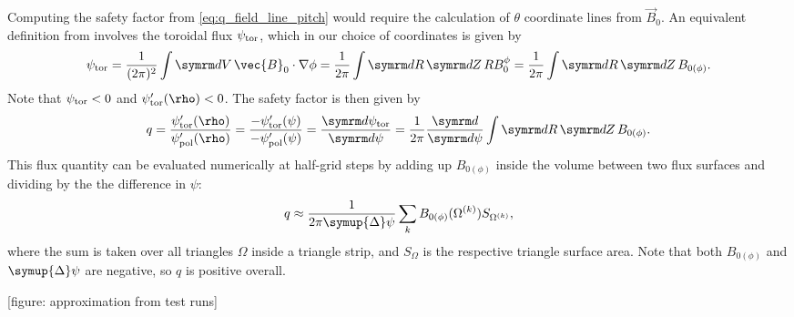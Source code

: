 Computing the safety factor from \cref{eq:q_field_line_pitch} would require the calculation of $\theta$ coordinate lines from $\vec{B}_{0}$. An equivalent definition from \textcite{dHaeseleer91} involves the toroidal flux $\psi_{\textrm{tor}}$, which in our choice of coordinates is given by
\begin{gather}
  \psi_{\tor} = \frac{1}{(2 \pi)^{2}} \int \diff V \, \vec{B}_{0} \cdot \grad \phi = \frac{1}{2 \pi} \int \diff R \, \diff Z \, R B_{0}^{\phi} = \frac{1}{2 \pi} \int \diff R \, \diff Z \, B_{0 (\phi)}.
\end{gather}
Note that $\psi_{\textrm{tor}} < 0$ and $\psi_{\tor}' (\rho) < 0$. The safety factor is then given by
\begin{gather}
  q = \frac{\psi_{\tor}' (\rho)}{\psi_{\pol}' (\rho)} = \frac{-\psi_{\tor}' (\psi)}{-\psi_{\pol}' (\psi)} = \td[\psi_{\tor}]{\psi} = \frac{1}{2 \pi} \td{\psi} \int \diff R \, \diff Z \, B_{0 (\phi)}.
\end{gather}
This flux quantity can be evaluated numerically at half-grid steps by adding up $B_{0 (\phi)}$ inside the volume between two flux surfaces and dividing by the the difference in $\psi$:
\begin{gather}
  q \approx \frac{1}{2 \pi \symup{\Delta} \psi} \sum_{k} B_{0 (\phi)} (\Omega^{(k)}) S_{\Omega^{(k)}},
\end{gather}
where the sum is taken over all triangles $\Omega$ inside a triangle strip, and $S_{\Omega}$ is the respective triangle surface area. Note that both $B_{0 (\phi)}$ and $\symup{\Delta} \psi$ are negative, so $q$ is positive overall.

[figure: approximation from test runs]

